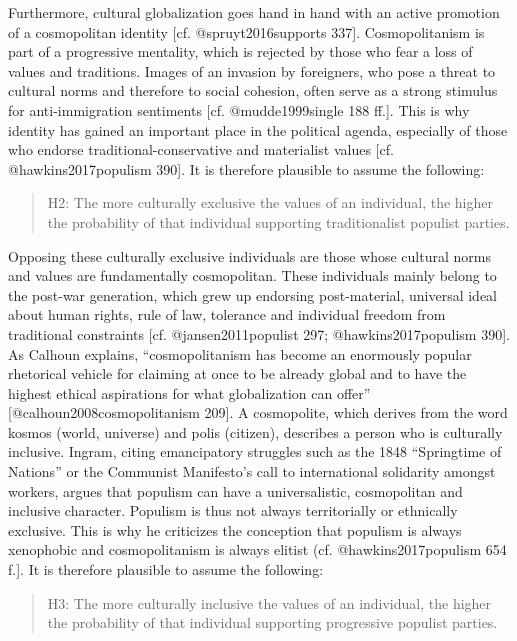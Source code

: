 \documentclass[]{article}
\begin{document}
Furthermore, cultural globalization goes hand in hand with an active
promotion of a cosmopolitan identity {[}cf. @spruyt2016supports 337{]}.
Cosmopolitanism is part of a progressive mentality, which is rejected by
those who fear a loss of values and traditions. Images of an invasion by
foreigners, who pose a threat to cultural norms and therefore to social
cohesion, often serve as a strong stimulus for anti-immigration
sentiments {[}cf. @mudde1999single 188 ff.{]}. This is why identity has
gained an important place in the political agenda, especially of those
who endorse traditional-conservative and materialist values {[}cf.
@hawkins2017populism 390{]}. It is therefore plausible to assume the
following:

\begin{quote}
H2: The more culturally exclusive the values of an individual, the
higher the probability of that individual supporting traditionalist
populist parties.
\end{quote}

Opposing these culturally exclusive individuals are those whose cultural
norms and values are fundamentally cosmopolitan. These individuals
mainly belong to the post-war generation, which grew up endorsing
post-material, universal ideal about human rights, rule of law,
tolerance and individual freedom from traditional constraints {[}cf.
@jansen2011populist 297; @hawkins2017populism 390{]}. As Calhoun
explains, ``cosmopolitanism has become an enormously popular rhetorical
vehicle for claiming at once to be already global and to have the
highest ethical aspirations for what globalization can offer''
{[}@calhoun2008cosmopolitanism 209{]}. A cosmopolite, which derives from
the word kosmos (world, universe) and polis (citizen), describes a
person who is culturally inclusive. Ingram, citing emancipatory
struggles such as the 1848 ``Springtime of Nations'' or the Communist
Manifesto's call to international solidarity amongst workers, argues
that populism can have a universalistic, cosmopolitan and inclusive
character. Populism is thus not always territorially or ethnically
exclusive. This is why he criticizes the conception that populism is
always xenophobic and cosmopolitanism is always elitist (cf.
@hawkins2017populism 654 f.{]}. It is therefore plausible to assume the
following:

\begin{quote}
H3: The more culturally inclusive the values of an individual, the
higher the probability of that individual supporting progressive
populist parties.
\end{quote}
\end{document}
